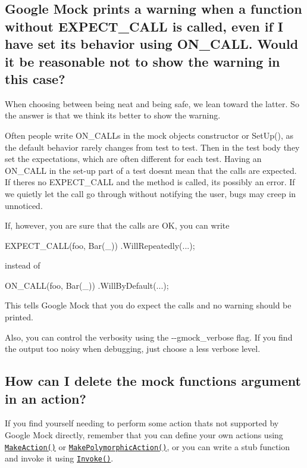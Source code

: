 \subsection*{Google Mock prints a warning when a function without E\+X\+P\+E\+C\+T\+\_\+\+C\+A\+LL is called, even if I have set its behavior using O\+N\+\_\+\+C\+A\+LL. Would it be reasonable not to show the warning in this case?}

When choosing between being neat and being safe, we lean toward the latter. So the answer is that we think it\textquotesingle{}s better to show the warning.

Often people write {\ttfamily O\+N\+\_\+\+C\+A\+LL}s in the mock object\textquotesingle{}s constructor or {\ttfamily Set\+Up()}, as the default behavior rarely changes from test to test. Then in the test body they set the expectations, which are often different for each test. Having an {\ttfamily O\+N\+\_\+\+C\+A\+LL} in the set-\/up part of a test doesn\textquotesingle{}t mean that the calls are expected. If there\textquotesingle{}s no {\ttfamily E\+X\+P\+E\+C\+T\+\_\+\+C\+A\+LL} and the method is called, it\textquotesingle{}s possibly an error. If we quietly let the call go through without notifying the user, bugs may creep in unnoticed.

If, however, you are sure that the calls are OK, you can write


\begin{DoxyCode}
EXPECT\_CALL(foo, Bar(\_))
    .WillRepeatedly(...);
\end{DoxyCode}


instead of


\begin{DoxyCode}
ON\_CALL(foo, Bar(\_))
    .WillByDefault(...);
\end{DoxyCode}


This tells Google Mock that you do expect the calls and no warning should be printed.

Also, you can control the verbosity using the {\ttfamily -\/-\/gmock\+\_\+verbose} flag. If you find the output too noisy when debugging, just choose a less verbose level.

\subsection*{How can I delete the mock function\textquotesingle{}s argument in an action?}

If you find yourself needing to perform some action that\textquotesingle{}s not supported by Google Mock directly, remember that you can define your own actions using \href{http://code.google.com/p/googlemock/wiki/V1_7_CookBook#Writing_New_Actions}{\tt Make\+Action()} or \href{http://code.google.com/p/googlemock/wiki/V1_7_CookBook#Writing_New_Polymorphic_Actions}{\tt Make\+Polymorphic\+Action()}, or you can write a stub function and invoke it using \href{http://code.google.com/p/googlemock/wiki/V1_7_CookBook#Using_Functions_Methods_Functors}{\tt Invoke()}.


